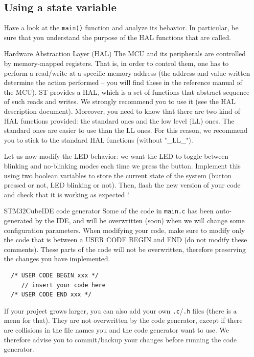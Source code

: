 \subsection{Using a state variable}

Have a look at the \texttt{main()} function and analyze its behavior. In particular, be sure that you understand the purpose of the HAL functions that are called.

\begin{bclogo}[couleur = gray!20, arrondi = 0.2, logo=\bcinfo]{Hardware Abstraction Layer (HAL)}
The MCU and its peripherals are controlled by memory-mapped registers. That is, in order to control them, one has to perform a read/write at a specific memory address (the address and value written determine the action performed -- you will find these in the reference manual of the MCU).
ST provides a HAL, which is a set of functions that abstract sequence of such reads and writes. We strongly recommend you to use it (see the HAL description document). Moreover, you need to know that there are two kind of HAL functions provided: the standard ones and the low level (LL) ones. The standard ones are easier to use than the LL ones. For this reason, we recommend you to stick to the standard HAL functions (without "\_LL\_").
\end{bclogo}

Let us now modify the LED behavior: we want the LED to toggle between blinking and no-blinking modes each time we press the button. Implement this using two boolean variables to store the current state of the system (button pressed or not, LED blinking or not). Then, flash the new version of your code and check that it is working as expected !

\begin{bclogo}[couleur = gray!20, arrondi = 0.2, logo=\bcattention]{STM32CubeIDE code generator}
Some of the code in \texttt{main.c} has been auto-generated by the IDE, and will be overwritten (soon) when we will change some configuration parameters.
When modifying your code, make sure to modify only the code that is between a USER CODE BEGIN and END (do not modify these comments). These parts of the code will not be overwritten, therefore preserving the changes you have implemented.
\begin{lstlisting}
  /* USER CODE BEGIN xxx */
     // insert your code here
  /* USER CODE END xxx */
\end{lstlisting}

If your project grows larger, you can also add your own \texttt{.c}/\texttt{.h} files (there is a menu for that). They are not overwritten by the code generator, except if there are collisions in the file names you and the code generator want to use. We therefore advise you to commit/backup your changes before running the code generator.
\end{bclogo}



